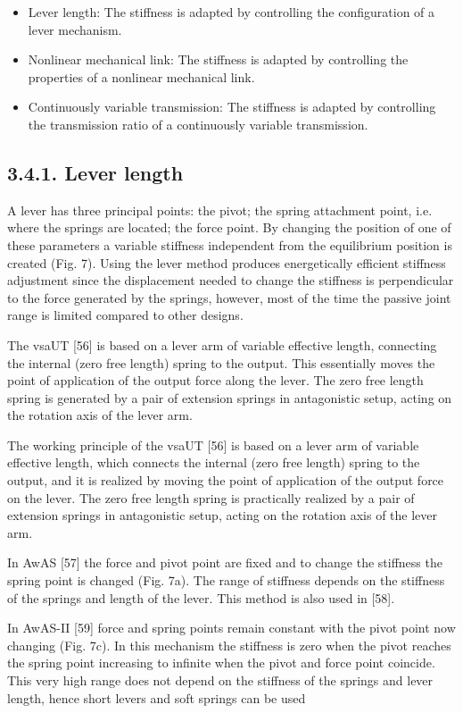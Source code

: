 \documentclass[10pt]{article}
\begin{document}
\begin{itemize}
  \item Lever length: The stiffness is adapted by controlling the configuration of a lever mechanism.
  \item Nonlinear mechanical link: The stiffness is adapted by controlling the properties of a nonlinear mechanical link.
  \item Continuously variable transmission: The stiffness is adapted by controlling the transmission ratio of a continuously variable transmission.
\end{itemize}

\subsection*{3.4.1. Lever length}
A lever has three principal points: the pivot; the spring attachment point, i.e. where the springs are located; the force point. By changing the position of one of these parameters a variable stiffness independent from the equilibrium position is created (Fig. 7). Using the lever method produces energetically efficient stiffness adjustment since the displacement needed to change the stiffness is perpendicular to the force generated by the springs, however, most of the time the passive joint range is limited compared to other designs.

The vsaUT [56] is based on a lever arm of variable effective length, connecting the internal (zero free length) spring to the output. This essentially moves the point of application of the output force along the lever. The zero free length spring is generated by a pair of extension springs in antagonistic setup, acting on the rotation axis of the lever arm.

The working principle of the vsaUT [56] is based on a lever arm of variable effective length, which connects the internal (zero free length) spring to the output, and it is realized by moving the point of application of the output force on the lever. The zero free length spring is practically realized by a pair of extension springs in antagonistic setup, acting on the rotation axis of the lever arm.

In AwAS [57] the force and pivot point are fixed and to change the stiffness the spring point is changed (Fig. 7a). The range of stiffness depends on the stiffness of the springs and length of the lever. This method is also used in [58].

In AwAS-II [59] force and spring points remain constant with the pivot point now changing (Fig. 7c). In this mechanism the stiffness is zero when the pivot reaches the spring point increasing to infinite when the pivot and force point coincide. This very high range does not depend on the stiffness of the springs and lever length, hence short levers and soft springs can be used
\end{document}
